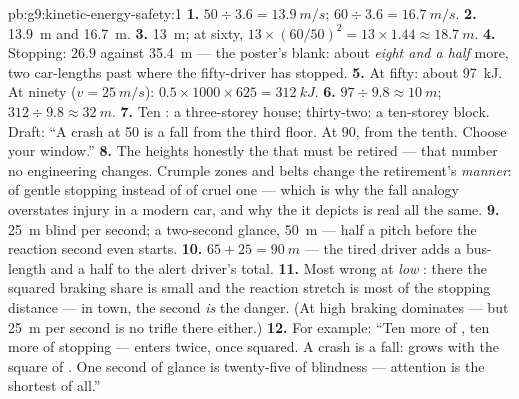 \begin{solution}{pb:g9:kinetic-energy-safety:1}
\textbf{1.} $50 \div 3.6 = \qty{13.9}{m/s}$; $60 \div 3.6 =
\qty{16.7}{m/s}$.
\textbf{2.} \qty{13.9}{m} and \qty{16.7}{m}.
\textbf{3.} \qty{13}{m}; at sixty, $13 \times (60/50)^2 =
13 \times 1.44 \approx \qty{18.7}{m}$.
\textbf{4.} Stopping: $26.9$ against \qty{35.4}{m} --- the
poster's blank: about \emph{eight and a half } more,
two car-lengths past where the fifty-driver has stopped.
\textbf{5.} At fifty: about \qty{97}{kJ}. At ninety ($v =
\qty{25}{m/s}$): $0.5 \times 1000 \times 625 =
\qty{312}{kJ}$.
\textbf{6.} $97 \div 9.8 \approx \qty{10}{m}$; $312 \div 9.8
\approx \qty{32}{m}$.
\textbf{7.} Ten : a three-storey house; thirty-two: a
ten-storey block. Draft: ``A crash at 50 is a fall from the
third floor. At 90, from the tenth. Choose your window.''
\textbf{8.} The heights honestly  the  that
must be retired --- that number no engineering changes.
Crumple zones and belts change the retirement's
\emph{manner}:  of gentle stopping instead of
 of cruel one --- which is why the fall analogy
overstates injury in a modern car, and why the  it
depicts is real all the same.
\textbf{9.} \qty{25}{m} blind per second; a two-second
glance, \qty{50}{m} --- half a pitch before the reaction
second even starts.
\textbf{10.} $65 + 25 = \qty{90}{m}$ --- the tired driver
adds a bus-length and a half to the alert driver's total.
\textbf{11.} Most wrong at \emph{low} : there the
squared braking share is small and the reaction stretch is
most of the stopping distance --- in town, the second
\emph{is} the danger. (At high  braking dominates ---
but \qty{25}{m} per second is no trifle there either.)
\textbf{12.} For example: ``Ten more of , ten more
 of stopping ---  enters twice, once squared.
A crash is a fall:  grows with the square of .
One second of glance is twenty-five  of blindness ---
attention is the shortest  of all.''
\end{solution}
